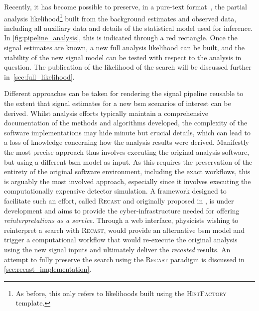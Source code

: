 Recently, it has become possible to preserve, in a pure-text format~\cite{ATL-PHYS-PUB-2019-029}, the partial analysis likelihood\footnote{As before, this only refers to likelihoods built using the \textsc{HistFactory} template.} built from the background estimates and observed data, including all auxiliary data and details of the statistical model used for inference. In \cref{fig:pipeline_analysis}, this is indicated through a red rectangle. 
Once the signal estimates are known, a new full analysis likelihood can be built, and the viability of the new signal model can be tested with respect to the analysis in question. The publication of the likelihood of the \onelepton search will be discussed further in~\cref{sec:full_likelihood}.

Different approaches can be taken for rendering the signal pipeline reusable to the extent that signal estimates for a new \gls{bsm} scenarios of interest can be derived. 
Whilst analysis efforts typically maintain a comprehensive documentation of the methods and algorithms developed, the complexity of the software implementations may hide minute but crucial details, which can lead to a loss of knowledge concerning how the analysis results were derived.
Manifestly the most precise approach thus involves executing the original analysis software, but using a different \gls{bsm} model as input. As this requires the preservation of the entirety of the original software environment, including the exact workflows, this is arguably the most involved approach, especially since it involves executing the computationally expensive detector simulation. 
A framework designed to facilitate such an effort, called \textsc{Recast} and originally proposed in \cite{RECAST_cranmer}, is under development and aims to provide the cyber-infrastructure needed for offering \textit{reinterpretations as a service}. 
Through a web interface, physicists wishing to reinterpret a search with \textsc{Recast}, would provide an alternative \gls{bsm} model and trigger a computational workflow that would re-execute the original analysis using the new signal inputs and ultimately deliver the \textit{recasted} results. An attempt to fully preserve the \onelepton search using the \textsc{Recast} paradigm is discussed in \cref{sec:recast_implementation}. 

